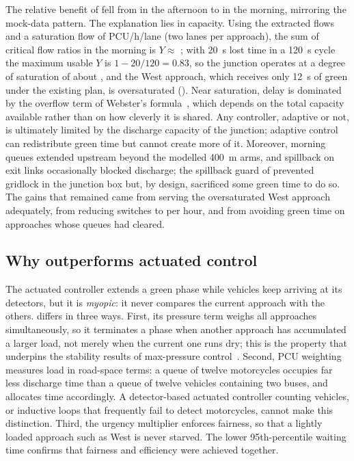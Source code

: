 The relative benefit of \prism{} fell from  in the afternoon to  in the morning, mirroring the mock-data pattern. The explanation lies in capacity. Using the extracted flows and a saturation flow of  PCU/h/lane (two lanes per approach), the sum of critical flow ratios in the morning is $Y \approx$ ; with 20~s lost time in a 120~s cycle the maximum usable $Y$ is $1 - 20/120 = 0.83$, so the junction operates at a degree of saturation of about , and the West approach, which receives only 12~s of green under the existing plan, is oversaturated (). Near saturation, delay is dominated by the overflow term of Webster's formula~\cite{webster1958}, which depends on the total capacity available rather than on how cleverly it is shared. Any controller, adaptive or not, is ultimately limited by the discharge capacity of the junction; adaptive control can redistribute green time but cannot create more of it. Moreover, morning queues extended upstream beyond the modelled 400~m arms, and spillback on exit links occasionally blocked discharge; the spillback guard of \prism{} prevented gridlock in the junction box but, by design, sacrificed some green time to do so. The gains that remained came from serving the oversaturated West approach adequately, from reducing switches to  per hour, and from avoiding green time on approaches whose queues had cleared.

\subsection{Why \prism{} outperforms actuated control}

The \sumo{} actuated controller extends a green phase while vehicles keep arriving at its detectors, but it is \emph{myopic}: it never compares the current approach with the others. \prism{} differs in three ways. First, its pressure term weighs all approaches simultaneously, so it terminates a phase when another approach has accumulated a larger load, not merely when the current one runs dry; this is the property that underpins the stability results of max-pressure control~\cite{varaiya2013maxpressure}. Second, PCU weighting measures load in road-space terms: a queue of twelve motorcycles occupies far less discharge time than a queue of twelve vehicles containing two buses, and \prism{} allocates time accordingly. A detector-based actuated controller counting vehicles, or inductive loops that frequently fail to detect motorcycles, cannot make this distinction. Third, the urgency multiplier enforces fairness, so that a lightly loaded approach such as West is never starved. The lower 95th-percentile waiting time confirms that fairness and efficiency were achieved together.

